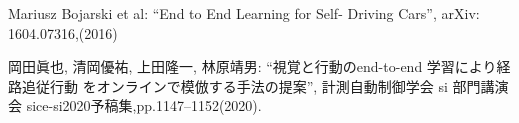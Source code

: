 \documentclass[10pt]{jarticle}
\begin{document}
    \vspace{5truemm}
    {\footnotesize
        \begin{thebibliography}{99}
            
            Mariusz Bojarski et al: “End to End Learning for Self-
            Driving Cars”, 
            arXiv: 1604.07316,(2016)
            
            岡田眞也, 清岡優祐, 上田隆一, 林原靖男: “視覚と行動のend-to-end 学習により経路追従行動 をオンラインで模倣する手法の提案”, 
            計測自動制御学会 si 部門講演会 sice-si2020予稿集,pp.1147–1152(2020).

        \end{thebibliography}
    }
    \normalsize
    
\end{document}
